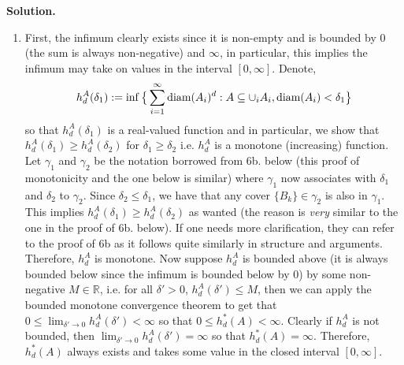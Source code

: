 \documentclass{article}
\begin{document}
    \textbf{Solution.}
    \begin{enumerate}
        \item First, the infimum clearly exists since it is non-empty and is bounded by 0 (the sum is always non-negative)
            and $\infty$, in particular, this implies the infimum may take on values in the interval $[0,\infty]$. Denote,
            \[ h_d^A(\delta_1) := \inf\big{\{}\sum_{i=1}^{\infty}\text{diam}(A_i)^d: A\subseteq\cup_i 
                A_i,\text{diam}(A_i)<\delta_1\big{\}} \]
            so that $h_d^A(\delta_1)$ is a real-valued function and in particular, we show that $h_d^A(\delta_1)\geq h_d^A(\delta_2)$
            for $\delta_1\geq\delta_2$ i.e. $h_d^A$ is a monotone (increasing) function. Let $\gamma_1$ and $\gamma_2$ be the
            notation borrowed from 6b. below (this proof of monotonicity and the one below is similar) where $\gamma_1$ now associates
            with $\delta_1$ and $\delta_2$ to $\gamma_2$. Since $\delta_2\leq\delta_1$, we have that any cover $\{B_k\}\in\gamma_2$
            is also in $\gamma_1$. This implies $h_d^A(\delta_1)\geq h_d^A(\delta_2)$ as wanted (the reason is \textit{very} similar
            to the one in the proof of 6b. below). If one needs more clarification, they
            can refer to the proof of 6b as it follows quite similarly in structure and arguments. Therefore, $h_d^A$ is monotone. 
            Now suppose $h_d^A$ is bounded above (it is always bounded below since the infimum is bounded below by 0) by some
            non-negative $M\in\mathbb{R}$, i.e. for all $\delta'>0$, $h_d^A(\delta') \leq M$, then we can apply the bounded
            monotone convergence theorem to get that $0\leq \lim_{\delta'\to 0} h_d^A(\delta') < \infty$ so that
            $0 \leq h_d^*(A) < \infty$. Clearly if $h_d^A$ is not bounded, then $\lim_{\delta'\to 0} h_d^A(\delta') = \infty$
            so that $h_d^*(A) = \infty$. Therefore, $h_d^*(A)$ always exists and takes some value in the closed interval $[0,\infty]$.


\end{enumerate}
\end{document}
